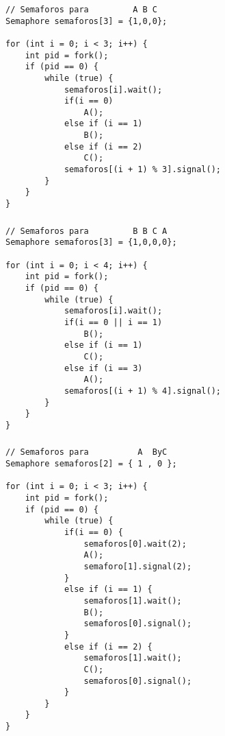 \subsubsection{}

\begin{codesnippet}
\begin{verbatim}
// Semaforos para         A B C
Semaphore semaforos[3] = {1,0,0};

for (int i = 0; i < 3; i++) {
    int pid = fork();
    if (pid == 0) {
        while (true) {
            semaforos[i].wait();
            if(i == 0)
                A();
            else if (i == 1)
                B();
            else if (i == 2)
                C();
            semaforos[(i + 1) % 3].signal();
        }
    }
}
\end{verbatim}
\end{codesnippet}

\subsubsection{}

\begin{codesnippet}
\begin{verbatim}
// Semaforos para         B B C A
Semaphore semaforos[3] = {1,0,0,0};

for (int i = 0; i < 4; i++) {
    int pid = fork();
    if (pid == 0) {
        while (true) {
            semaforos[i].wait();
            if(i == 0 || i == 1)
                B();
            else if (i == 1)
                C();
            else if (i == 3)
                A();
            semaforos[(i + 1) % 4].signal();
        }
    }
}
\end{verbatim}
\end{codesnippet}

\subsubsection{}

\begin{codesnippet}
\begin{verbatim}
// Semaforos para          A  ByC
Semaphore semaforos[2] = { 1 , 0 };

for (int i = 0; i < 3; i++) {
    int pid = fork();
    if (pid == 0) {
        while (true) {
            if(i == 0) {
                semaforos[0].wait(2);
                A();
                semaforo[1].signal(2);
            }
            else if (i == 1) {
                semaforos[1].wait();
                B();
                semaforos[0].signal();
            }
            else if (i == 2) {
                semaforos[1].wait();
                C();
                semaforos[0].signal();
            }
        }
    }
}
\end{verbatim}
\end{codesnippet}

